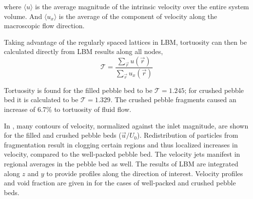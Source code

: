 where $\langle u \rangle$ is the average magnitude of the intrinsic velocity over the entire system volume. And $\langle u_x \rangle$ is the average of the component of velocity along the macroscopic flow direction.

Taking advantage of the regularly spaced lattices in LBM, tortuosity can then be calculated directly from LBM results along all nodes,
\begin{equation}
\mathscr{T} = \frac{\sum_{\vec{r}}u(\vec{r})}{\sum_{\vec{r}} u_x(\vec{r})}
\end{equation}

Tortuosity is found for the filled pebble bed to be $\mathscr{T} = 1.245$; for crushed pebble bed it is calculated to be $\mathscr{T} = 1.329$. The crushed pebble fragments caused an increase of 6.7\% to tortuosity of fluid flow.

In , many contours of velocity, normalized against the inlet magnitude, are shown for the filled and crushed pebble beds ($\vec{u}/U_0$). Redistribution of particles from fragmentation result in clogging certain regions and thus localized increases in velocity, compared to the well-packed pebble bed. The velocity jets manifest in regional averages in the pebble bed as well. The results of LBM are integrated along $z$ and $y$ to provide profiles along the direction of interest. Velocity profiles and void fraction are given in  for the cases of well-packed and crushed pebble beds.

